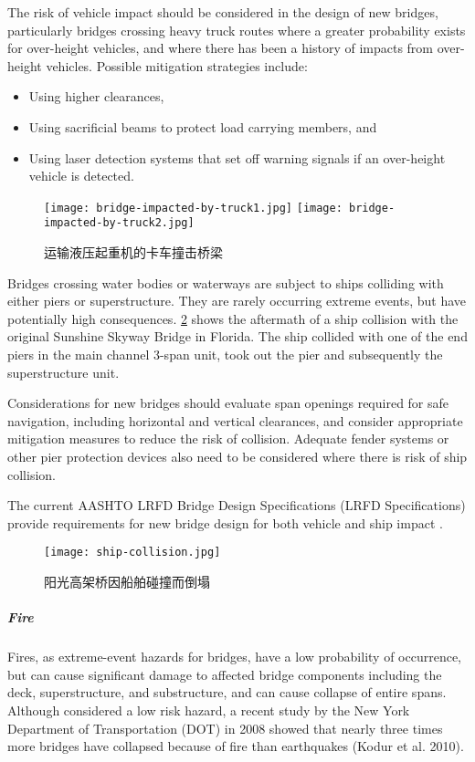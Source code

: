 The risk of vehicle impact should be considered in the design of new bridges, particularly bridges crossing heavy
truck routes where a greater probability exists for over-height vehicles, and where there has been a history of impacts
from over-height vehicles. Possible mitigation strategies include:
\begin{itemize}
  \item Using higher clearances,
  \item Using sacrificial beams to protect load carrying members, and
  \item Using laser detection systems that set off warning signals if an over-height vehicle is detected.
\end{itemize}

\begin{figure}
  \texttt{[image: bridge-impacted-by-truck1.jpg]}\hfill
  \texttt{[image: bridge-impacted-by-truck2.jpg]}
  \caption{运输液压起重机的卡车撞击桥梁}
  \label{fig:bridge-impacted-by-truck}
\end{figure}

Bridges crossing water bodies or waterways are subject to ships colliding with either piers or superstructure.
They are rarely occurring extreme events, but have potentially high consequences. \cref{fig:ship-collision} shows the aftermath
of a ship collision with the original Sunshine Skyway Bridge in Florida. The ship collided with one of the end piers
in the main channel 3-span unit, took out the pier and subsequently the superstructure unit.

Considerations for new bridges should evaluate span openings required for safe navigation, including horizontal
and vertical clearances, and consider appropriate mitigation measures to reduce the risk of collision. Adequate
fender systems or other pier protection devices also need to be considered where there is risk of ship collision.

The current AASHTO LRFD Bridge Design Specifications (LRFD Specifications) provide requirements for new bridge design for both vehicle and ship impact \cite{aashto2012l}.

\begin{figure}
  \texttt{[image: ship-collision.jpg]}
  \caption{阳光高架桥因船舶碰撞而倒塌}
  \label{fig:ship-collision}
\end{figure}

\subparagraph{Fire}
Fires, as extreme-event hazards for bridges, have a low probability of occurrence, but can cause significant
damage to affected bridge components including the deck, superstructure, and substructure, and can cause collapse of
entire spans. Although considered a low risk hazard, a recent study by the New York Department of Transportation
(DOT) in 2008 showed that nearly three times more bridges have collapsed because of fire than earthquakes (Kodur
et al. 2010).

